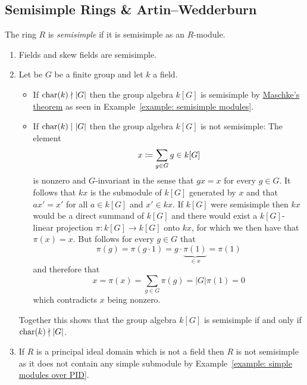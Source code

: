 \subsection{Semisimple Rings \& Artin--Wedderburn}


\begin{definition}
  The ring $R$ is \emph{semisimple} if it is semisimple as an $R$-module.
\end{definition}


\begin{example}
  \label{example: semisimple rings}
  \leavevmode
  \begin{enumerate}
    \item
      Fields and skew fields are semisimple.
    \item
      Let be $G$ be a finite group and let $k$ a field.
      \begin{itemize}
        \item
          If $\operatorname{char}(k) \nmid |G|$ then the group algebra $k[G]$ is semisimple by \hyperref[theorem: maschkes theorem]{Maschke’s theorem} as seen in Example~\ref{example: semisimple modules}.
        \item
          If $\operatorname{char}(k) \mid |G|$ then the group algebra $k[G]$ is not semisimple:
          The element
          \[
                      x
            \coloneqq  \sum_{g \in G} g
            \in       k[G]
          \]
          is nonzero and $G$-invariant in the sense that $gx = x$ for every $g \in G$.
          It follows that $kx$ is the submodule of $k[G]$ generated by $x$ and that $ax' = x'$ for all $a \in k[G]$ and $x' \in kx$.
          If $k[G]$ were semisimple then $kx$ would be a direct summand of $k[G]$ and there would exist a $k[G]$-linear projection $\pi \colon k[G] \to k[G]$ onto $kx$, for which we then have that $\pi(x) = x$.
          But follows for every $g \in G$ that
          \[
              \pi(g)
            = \pi(g \cdot 1)
            = g \cdot \underbrace{ \pi(1) }_{\in x}
            = \pi(1)
          \]
          and therefore that
          \[
              x
            = \pi(x)
            = \sum_{g \in G} \pi(g)
            = |G| \pi(1)
            = 0
          \]
          which contradicts $x$ being nonzero.
      \end{itemize}
      Together this shows that the group algebra $k[G]$ is semisimple if and only if $\operatorname{char}(k) \nmid |G|$.
    \item
      If $R$ is a principal ideal domain which is not a field then $R$ is not semisimple as it does not contain any simple submodule by Example~\ref{example: simple modules over PID}.

\end{enumerate}
\end{example}
